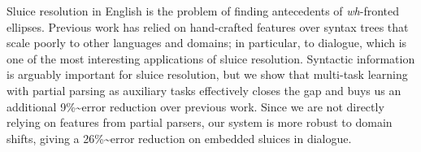 Sluice resolution in English is the problem of finding antecedents of {\em wh}-fronted ellipses. Previous work has relied on hand-crafted features over syntax trees that scale poorly to other languages and domains; in particular, to dialogue, which is one of the most interesting applications of sluice resolution. Syntactic information is arguably important for sluice resolution, but we show that multi-task learning with partial parsing as auxiliary tasks effectively closes the gap and buys us an additional 9\%{\textasciitilde}error reduction over previous work. Since we are not directly relying on features from partial parsers, our system is more robust to domain shifts, giving a 26\%{\textasciitilde}error reduction on embedded sluices in dialogue.
